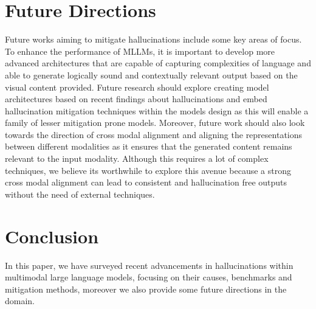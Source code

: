 \documentclass[twocolumn, 9pt]{extarticle}
\begin{document}
\section{Future Directions}
Future works aiming to mitigate  hallucinations include some key areas of focus. To enhance the performance of MLLMs, it is important to develop more advanced architectures that are capable of capturing complexities of language and able to generate logically sound and contextually relevant output based on the visual content provided. Future research should explore creating model architectures based on recent findings about hallucinations and embed hallucination mitigation techniques within the models design as this will enable a family of lesser mitigation prone models. Moreover, future work should also look towards the direction of cross modal alignment and aligning the representations between different modalities as it ensures that the generated content remains relevant to the input modality. Although this requires a lot of complex techniques, we believe its worthwhile to explore this avenue because a strong cross modal alignment can lead to consistent and hallucination free outputs without the need of external techniques. 

\section{Conclusion}
In this paper, we have surveyed recent advancements in hallucinations within multimodal large language models, focusing on their causes, benchmarks and mitigation methods, moreover we also provide some future directions in the domain. 




\end{document}
